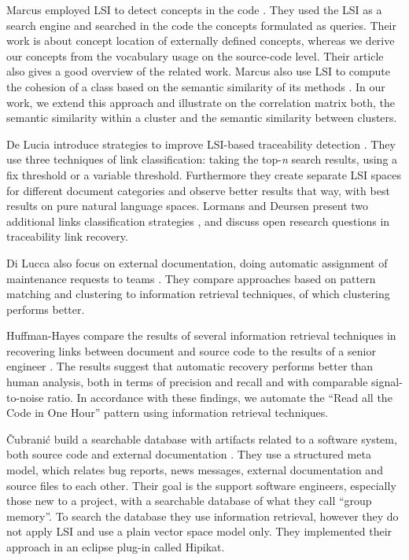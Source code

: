 Marcus \etal employed LSI to detect concepts in the code \cite{Marc04a}. They used the LSI as a search engine and searched in the code the concepts formulated as queries. Their work is about concept location of externally defined concepts, whereas we derive our concepts from the vocabulary usage on the source-code level. Their  article also gives a good overview of the related work. Marcus \etal also use LSI to compute the cohesion of a class based on the semantic similarity of its methods \cite{Marc05a}. In our work, we extend this approach and illustrate on the correlation matrix both, the semantic similarity within a cluster and the semantic similarity between clusters.

De Lucia \etal introduce strategies to improve LSI-based traceability detection \cite{Luci04a}. They use three techniques of link classification: taking the top-\emph{n} search results, using a fix threshold or a variable threshold. Furthermore they create separate LSI spaces for different document categories and observe better results that way, with best results on pure natural language spaces. Lormans and Deursen present two additional links classification strategies \cite{Lorm06a}, and discuss open research questions in traceability link recovery.

Di Lucca \etal also focus on external documentation, doing automatic assignment of maintenance requests to teams \cite{Lucc02b}. They compare approaches based on pattern matching and clustering to information retrieval techniques, of which clustering performs better.

Huffman-Hayes \etal compare the results of several information retrieval techniques in recovering links between document and source code to the results of a senior engineer \cite{Huff06a}. The results suggest that automatic recovery performs better than human analysis, both in terms of precision and recall and with comparable signal-to-noise ratio. In accordance with these findings, we automate the ``Read all the Code in One Hour'' pattern using information retrieval techniques.

\v{C}ubrani\'{c} \etal build a searchable database with artifacts related to a software system, both source code and external documentation \cite{Cubr03a}. They use a structured meta model, which relates bug reports, news messages, external documentation and source files to each other. Their goal is the support software engineers, especially those new to a project, with a searchable database of what they call ``group memory''. To search the database they use information retrieval, however they do not apply LSI and use a plain vector space model only. They implemented their approach in an eclipse plug-in called Hipikat.

